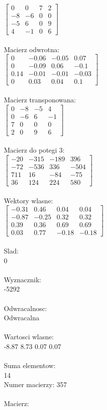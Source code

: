 \documentclass[a4paper,12pt]{article}
\begin{document}
$\begin{bmatrix} 0&0&7&2\\-8&-6&0&0\\-5&6&0&9\\4&-1&0&6 \end{bmatrix}$
\\
\\
Macierz odwrotna:\\

$\begin{bmatrix} 0&-0.06&-0.05&0.07\\0&-0.09&0.06&-0.1\\0.14&-0.01&-0.01&-0.03\\0&0.03&0.04&0.1 \end{bmatrix}$
\\
\\
Macierz transponowana:\\

$\begin{bmatrix} 0&-8&-5&4\\0&-6&6&-1\\7&0&0&0\\2&0&9&6 \end{bmatrix}$
\\
\\
Macierz do potegi 3:\\

$\begin{bmatrix} -20&-315&-189&396\\-72&-536&336&-504\\711&16&-84&-75\\36&124&224&580 \end{bmatrix}$
\\
\\
Wektory wlasne:\\

$\begin{bmatrix} -0.31&0.46&0.04&0.04\\-0.87&-0.25&0.32&0.32\\0.39&0.36&0.69&0.69\\0.03&0.77&-0.18&-0.18 \end{bmatrix}$
\\
\\
Slad:\\
0
\\
\\
Wyznacznik:\\
-5292
\\
\\
Odwracalnosc:\\
Odwracalna
\\
\\
Wartosci wlasne:\\
-8.87 8.73 0.07 0.07
\\
\\
Suma elementow:\\
14
\\
\newpage
Numer macierzy:
357
\\
\\
Macierz:\\
\end{document}
